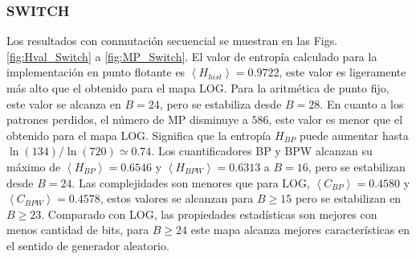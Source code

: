 \subsubsection{SWITCH} \label{sssec:switch}

Los resultados con conmutación secuencial se muestran en las Figs. \ref{fig:Hval_Switch} a \ref{fig:MP_Switch}.
El valor de entropía calculado para la implementación en punto flotante es $\left \langle H_{hist} \right \rangle = 0.9722$, este valor es ligeramente más alto que el obtenido para el mapa LOG.
Para la aritmética de punto fijo, este valor se alcanza en $B = 24$, pero se estabiliza desde $B = 28$.
En cuanto a los patrones perdidos, el número de MP disminuye a $586$, este valor es menor que el obtenido para el mapa LOG.
Significa que la entropía $H_{BP}$ puede aumentar hasta $\ln(134) / \ln(720) \simeq 0.74$.
Los cuantificadores BP y BPW alcanzan su máximo de $\left \langle H_{BP} \right \rangle = 0.6546$ y $\left \langle H_{BPW} \right \rangle = 0.6313$ a $B = 16$, pero se estabilizan desde $B = 24$.
Las complejidades son menores que para LOG, $\left \langle C_{BP} \right \rangle = 0.4580$ y $\left \langle C_{BPW} \right \rangle = 0.4578$, estos valores se alcanzan para $B \geq 15$ pero se estabilizan en $B \geq 23$.
Comparado con LOG, las propiedades estadísticas son mejores con menos cantidad de bits, para $B \geq 24$ este mapa alcanza mejores características en el sentido de generador aleatorio.

